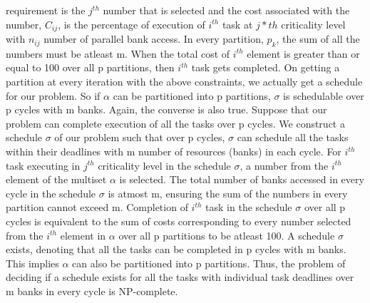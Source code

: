 requirement is the $j^{th}$ number that is selected and the cost associated with the number, $C_{ij}$, is the percentage of 
execution of $i^{th}$ task at $j*{th}$ criticality level with $n_{ij}$ number of parallel bank access. In every partition, 
$p_{k}$, the sum of all the numbers must be atleast m. When the total cost of $i^{th}$ element is greater than or equal to 100 
over all p partitions, then $i^{th}$ task gets completed. On getting a partition at every iteration with the above 
constraints, we actually get a schedule for our problem. So if $\alpha$ can be partitioned into p partitions, $\sigma$ is 
schedulable over p cycles with m banks.
Again, the converse is also true.
Suppose that our problem can complete execution of all the tasks over p cycles. We construct a schedule $\sigma$ of our 
problem such that over p cycles, $\sigma$ can schedule all the tasks within their deadlines with m number of resources (banks)
in each cycle. For $i^{th}$ task executing in $j^{th}$ criticality level in the schedule $\sigma$, a number from the $i^{th}$ 
element of the multiset $\alpha$ is selected. The total number of banks accessed in every cycle in the schedule $\sigma$ is 
atmost m, ensuring the sum of the numbers in every partition cannot exceed m. Completion of $i^{th}$ task in the schedule 
$\sigma$ over all p cycles is equivalent to the sum of costs corresponding to every number selected from the $i^{th}$ element 
in $\alpha$ over all p partitions to be atleast 100. A schedule $\sigma$ exists, denoting that all the tasks can be completed 
in p cycles with m banks. This implies $\alpha$ can also be partitioned into p partitions. Thus, the problem of deciding if a schedule exists for all the tasks with individual task deadlines over m banks in every cycle is
NP-complete.



